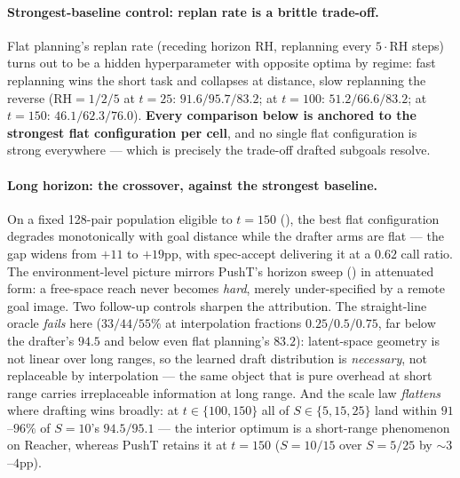 \documentclass{article}
\begin{document}
\paragraph{Strongest-baseline control: replan rate is a brittle trade-off.}
Flat planning's replan rate (receding horizon RH, replanning every $5\cdot$RH steps)
turns out to be a hidden hyperparameter with opposite optima by regime: fast replanning
wins the short task and collapses at distance, slow replanning the reverse
(RH${=}1/2/5$ at $t{=}25$: $91.6/95.7/83.2$; at $t{=}100$: $51.2/66.6/83.2$; at
$t{=}150$: $46.1/62.3/76.0$). \textbf{Every comparison below is anchored to the
strongest flat configuration per cell}, and no single flat configuration is strong
everywhere --- which is precisely the trade-off drafted subgoals resolve.

\paragraph{Long horizon: the crossover, against the strongest baseline.}
On a fixed 128-pair population eligible to $t{=}150$ (), the
best flat configuration degrades monotonically with goal distance while the drafter
arms are flat --- the gap widens from $+11$ to $+19$pp, with spec-accept delivering it
at a $0.62$ call ratio. The environment-level picture mirrors PushT's horizon sweep
() in attenuated form: a free-space reach never becomes \emph{hard},
merely under-specified by a remote goal image. Two follow-up controls sharpen the
attribution. The straight-line oracle \emph{fails} here ($33/44/55\%$ at interpolation
fractions $0.25/0.5/0.75$, far below the drafter's $94.5$ and below even flat
planning's $83.2$): latent-space geometry is not linear over long ranges, so the
learned draft distribution is \emph{necessary}, not replaceable by interpolation ---
the same object that is pure overhead at short range carries irreplaceable information
at long range. And the scale law \emph{flattens} where drafting wins broadly: at
$t\in\{100,150\}$ all of $S\in\{5,15,25\}$ land within $91$--$96\%$ of $S{=}10$'s
$94.5/95.1$ --- the interior optimum is a short-range phenomenon on Reacher, whereas
PushT retains it at $t{=}150$ ($S{=}10/15$ over $S{=}5/25$ by ${\sim}3$--$4$pp).
\end{document}
